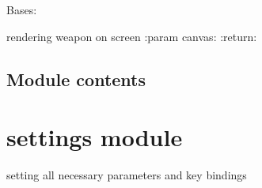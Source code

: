 \documentclass[letterpaper,10pt,english]{sphinxmanual}
\begin{document}
\begin{fulllineitems}
\label{\detokenize{objects:objects.Weapon.Weapon}}
\pysigstartsignatures
{}
\pysigstopsignatures
\sphinxAtStartPar
Bases: 

\begin{fulllineitems}
\label{\detokenize{objects:objects.Weapon.Weapon.render}}
\pysigstartsignatures
{}
\pysigstopsignatures
\sphinxAtStartPar
rendering weapon on screen
:param canvas:
:return:

\end{fulllineitems}


\begin{fulllineitems}
\label{\detokenize{objects:objects.Weapon.Weapon.update}}
\pysigstartsignatures
{}
\pysigstopsignatures
\end{fulllineitems}


\end{fulllineitems}



\subsection{Module contents}
\label{\detokenize{objects:module-objects}}\label{\detokenize{objects:module-contents}}
\sphinxstepscope


\section{settings module}
\label{\detokenize{settings:module-settings}}\label{\detokenize{settings:settings-module}}\label{\detokenize{settings::doc}}
\sphinxAtStartPar
setting all necessary parameters and key bindings
\end{document}
